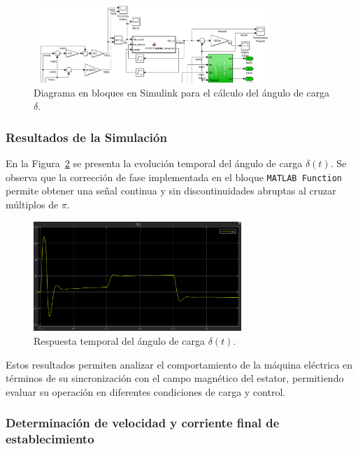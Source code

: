 \documentclass{article}
\begin{document}
\begin{figure}[H]
    \centering
    \includegraphics[width=0.8\textwidth]{Imagenes/BloquesAnguloCarga.png}
    \caption{Diagrama en bloques en Simulink para el cálculo del ángulo de carga \(\delta\).}
    \label{fig:BloquesAnguloCarga}
\end{figure}

\subsubsection*{Resultados de la Simulación}

En la Figura~\ref{fig:AnguloCargaSimulacionDT} se presenta la evolución temporal del ángulo de carga \(\delta(t)\). Se observa que la corrección de fase implementada en el bloque \texttt{MATLAB Function} permite obtener una señal continua y sin discontinuidades abruptas al cruzar múltiplos de \(\pi\).

\begin{figure}[H]
    \centering
    \includegraphics[width=0.7\textwidth]{Imagenes/AnguloCargaSimulacionDT.png}
    \caption{Respuesta temporal del ángulo de carga \(\delta(t)\).}
    \label{fig:AnguloCargaSimulacionDT}
\end{figure}

Estos resultados permiten analizar el comportamiento de la máquina eléctrica en términos de su sincronización con el campo magnético del estator, permitiendo evaluar su operación en diferentes condiciones de carga y control.



\subsubsection{Determinación de velocidad y corriente final de establecimiento}
\end{document}
